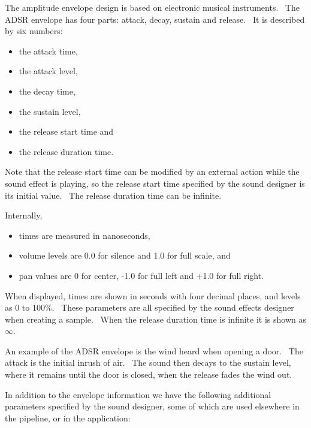 \documentclass[letterpaper]{article}
\newcommand\liststyleLvi{%
\renewcommand\labelitemi{•}
\renewcommand\labelitemii{◦}
\renewcommand\labelitemiii{${\blacksquare}$}
\renewcommand\labelitemiv{•}
}
\newcommand\liststyleLvii{%
\renewcommand\labelitemi{•}
\renewcommand\labelitemii{◦}
\renewcommand\labelitemiii{${\blacksquare}$}
\renewcommand\labelitemiv{•}
}
\begin{document}
The amplitude envelope design is based on electronic musical
instruments. \ The ADSR envelope has four parts: attack, decay, sustain
and release. \ It is described by six numbers: 

\liststyleLvi
\begin{itemize}
\item the attack time, 
\item the attack level, 
\item the decay time, 
\item the sustain level, 
\item the release start time and 
\item the release duration time. \ 
\end{itemize}
Note that the release start time can be modified by an external action
while the sound effect is playing, so the release start time specified
by the sound designer is its initial value. \ The release duration time
can be infinite.

Internally, 

\liststyleLvii
\begin{itemize}
\item times are measured in nanoseconds, 
\item volume levels are 0.0 for silence and 1.0 for full scale, and 
\item pan values are 0 for center, -1.0 for full left and +1.0 for full
right. 
\end{itemize}
When displayed, times are shown in seconds with four decimal places, and
levels as 0 to 100\%. \ These parameters are all specified by the sound
effects designer when creating a sample. \ When the release duration
time is infinite it is shown as ${\infty}$.

An example of the ADSR envelope is the wind heard when opening a door.
\ The attack is the initial inrush of air. \ The sound then decays to
the sustain level, where it remains until the door is closed, when the
release fades the wind out.

In addition to the envelope information we have the following additional
parameters specified by the sound designer, some of which are used
elsewhere in the pipeline, or in the application:
\end{document}
